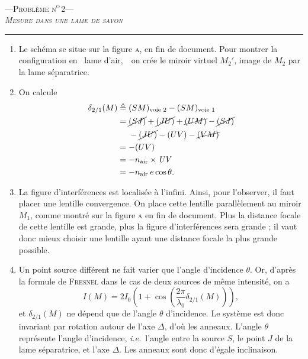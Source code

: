 \documentclass[a4paper, 11pt]{article}
\let\gguillemotleft\guillemotleft
\let\gguillemotright\guillemotright
\def\guillemotleft{\textsf{\gguillemotleft}}
\def\guillemotright{\textsf{\gguillemotright}}
\begin{document}
	\begin{center}
		\LARGE\scshape ---\quad Problème n\textsuperscript o\,2\quad--- \\
		\itshape Mesure dans une lame de savon
	\end{center}

	\begin{multicols}{2}
		\quad\hrule
		\begin{enumerate}[label=(\arabic*)]
			\item Le schéma se situe sur la figure \textsc{a}, en fin de document. Pour montrer la configuration en \guillemotleft~lame d'air,~\guillemotright\ on crée le miroir virtuel $M_2'$, image de $M_2$\/ par la lame séparatrice.
			\item On calcule
				\begin{align*}
					\delta_{2 / 1}(M) &\triangleq (SM)_\text{voie 2} - (SM)_\text{voie 1}\\
					&= \cancel{(SJ)} + \cancel{(JU)} + \cancel{(UM)}- \cancel{(SJ)}\\
					&\mathrel{\phantom=}{} - \cancel{(JU)} - (UV) - \cancel{(VM)} \\
					&= -(UV)\\
					&= -n_\text{air} \times \mathit{UV} \\
					&= -n_\text{air}\:e \cos\theta. \\
				\end{align*}
			\item La figure d'interférences est localisée à l'infini. Ainsi, pour l'observer, il faut placer une lentille convergence.
				On place cette lentille parallèlement au miroir $M_1$, comme montré sur la figure \textsc{a} en fin de document.
				Plus la distance focale de cette lentille est grande, plus la figure d'interférences sera grande ; il vaut donc mieux choisir une lentille ayant une distance focale la plus grande possible.
			\item Un point source différent ne fait varier que l'angle d'incidence $\theta$. Or, d'après la formule de \textsc{Fresnel} dans le cas de deux sources de même intensité, on a \[
					I(M) = 2I_0\left( 1 + \cos\left( \frac{2\pi}{\lambda_0} \delta_{2 / 1}(M) \right)  \right),
				\] et $\delta_{2 / 1}(M)$\/ ne dépend que de l'angle $\theta$\/ d'incidence. Le système est donc invariant par rotation autour de l'axe $\Delta$, d'où les anneaux. L'angle $\theta$\/ représente l'angle d'incidence, \textit{i.e.}\ l'angle entre la source $S$, le point $J$\/ de la lame séparatrice, et l'axe $\Delta$. Les anneaux sont donc d'égale inclinaison.

\end{enumerate}
\end{multicols}
\end{document}
